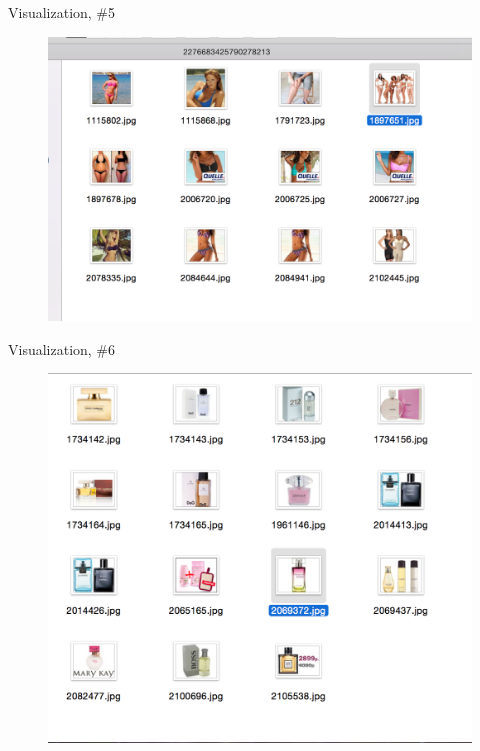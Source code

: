 \documentclass{beamer}
\begin{document}
\begin{frame}{Visualization, \#5}

\begin{figure}[h!]
  \centering
  \includegraphics[width=1\textwidth]{images/search5.png}
\end{figure}

\end{frame}


\begin{frame}{Visualization, \#6}

\begin{figure}[h!]
  \centering
  \includegraphics[width=1\textwidth]{images/search6.png}
\end{figure}

\end{frame}
\end{document}
